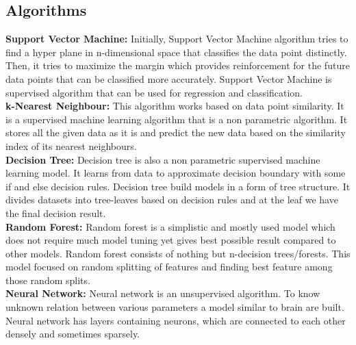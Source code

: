 \subsection{Algorithms}
\textbf{Support Vector Machine:} Initially, Support Vector Machine algorithm tries to find a hyper plane in n-dimensional space that classifies the data point distinctly. Then, it tries to maximize the margin which provides reinforcement for the future data points that can be classified more accurately. Support Vector Machine is supervised algorithm that can be used for regression and classification.\\[5pt]
\textbf{k-Nearest Neighbour:} This algorithm works based on data point similarity. It is a supervised machine learning algorithm that is a non parametric algorithm. It stores all the given data as it is and predict the new data based on the similarity index of its nearest neighbours.\\[5pt]
\textbf{Decision Tree:} Decision tree is also a non parametric supervised machine learning model. It learns from data to approximate decision boundary with some if and else decision rules. Decision tree build models in a form of tree structure. It divides datasets into tree-leaves based on decision rules and at the leaf we have the final decision result.\\[5pt]
\textbf{Random Forest:} Random forest is a simplistic and mostly used model which does not require much model tuning yet gives best possible result compared to other models. Random forest consists of nothing but n-decision trees/forests. This model focused on random splitting of features and finding best feature among those random splits.\\[5pt]
\textbf{Neural Network:} Neural network is an unsupervised algorithm. To know unknown relation between various parameters a model similar to brain are built. Neural network has layers containing neurons, which are connected to each other densely and sometimes sparsely.\\[5pt]

